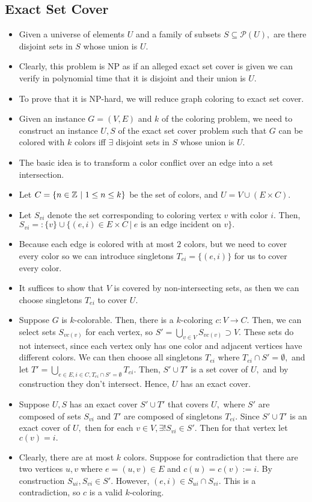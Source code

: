 \documentclass[a4paper,12pt]{article}
\begin{document}
\subsection{Exact Set Cover}
\begin{itemize}
    \item Given a universe of elements $U$ and a family of subsets $S\subseteq\mathcal P(U),$ are there disjoint sets in $S$ whose union is $U.$
    \item Clearly, this problem is NP as if an alleged exact set cover is given we can verify in polynomial time that it is disjoint and their union is $U.$
    \item To prove that it is NP-hard, we will reduce graph coloring to exact set cover.
    \item Given an instance $G=(V,E)$ and $k$ of the coloring problem, we need to construct an instance $U,S$ of the exact set cover problem such that $G$ can be colored with $k$ colors iff $\exists$ disjoint sets in $S$ whose union is $U.$
    \item The basic idea is to transform a color conflict over an edge into a set intersection.
    \item Let $C=\{n\in\mathbb{Z}~|~1\leq n\leq k\}$ be the set of colors, and $U=V\cup (E\times C).$
    \item Let $S_{vi}$ denote the set corresponding to coloring vertex $v$ with color $i.$ Then, $S_{vi}=:\{v\}\cup\{(e,i)\in E\times C~|~e \text{ is an edge incident on }v\}.$
    \item Because each edge is colored with at most $2$ colors, but we need to cover every color so we can introduce singletons $T_{ei}=\{(e,i)\}$ for us to cover every color.
    \item It suffices to show that $V$ is covered by non-intersecting sets, as then we can choose singletons $T_{ei}$ to cover $U.$
    \item Suppose $G$ is $k$-colorable. Then, there is a $k$-coloring $c:V\to C.$ Then, we can select sets $S_{vc(v)}$ for each vertex, so $S'=\bigcup_{v\in V}S_{vc(v)}\supset V$. These sets do not intersect, since each vertex only has one color and adjacent vertices have different colors. We can then choose all singletons $T_{ei}$ where $T_{ei}\cap S'=\emptyset,$ and let $T'=\bigcup_{e\in E,i\in C,T_{ei}\cap S'=\emptyset}T_{ei}.$ Then, $S'\cup T'$ is a set cover of $U,$ and by construction they don't intersect. Hence, $U$ has an exact cover.
    \item Suppose $U,S$ has an exact cover $S'\cup T'$ that covers $U,$ where $S'$ are composed of sets $S_{vi}$ and $T'$ are composed of singletons $T_{ei}.$ Since $S'\cup T'$ is an exact cover of $U,$ then for each $v\in V,\exists!S_{vi}\in S'.$ Then for that vertex let $c(v)=i.$
    \item Clearly, there are at most $k$ colors. Suppose for contradiction that there are two vertices $u,v$ where $e=(u,v)\in E$ and $c(u)=c(v):=i.$ By construction $S_{ui},S_{vi}\in S'.$ However, $(e,i)\in S_{ui}\cap S_{vi}.$ This is a contradiction, so $c$ is a valid $k$-coloring.
\end{itemize}
\end{document}
